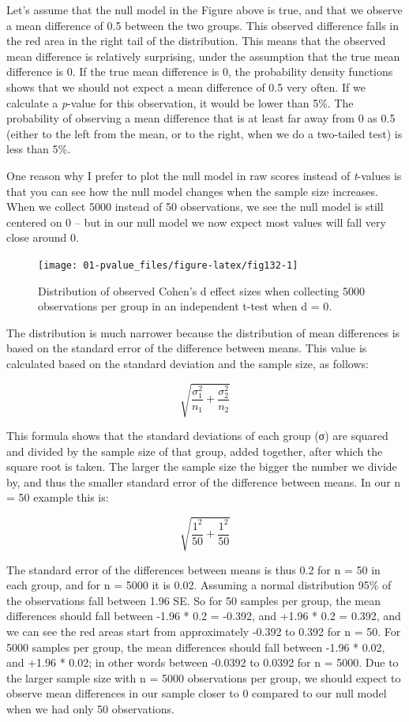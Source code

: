 \documentclass[
  oneside]{book}
\begin{document}
Let's assume that the null model in the Figure above is true, and that we observe a mean difference of 0.5 between the two groups. This observed difference falls in the red area in the right tail of the distribution. This means that the observed mean difference is relatively surprising, under the assumption that the true mean difference is 0. If the true mean difference is 0, the probability density functions shows that we should not expect a mean difference of 0.5 very often. If we calculate a \emph{p}-value for this observation, it would be lower than 5\%. The probability of observing a mean difference that is at least far away from 0 as 0.5 (either to the left from the mean, or to the right, when we do a two-tailed test) is less than 5\%.

One reason why I prefer to plot the null model in raw scores instead of \emph{t}-values is that you can see how the null model changes when the sample size increases. When we collect 5000 instead of 50 observations, we see the null model is still centered on 0 -- but in our null model we now expect most values will fall very close around 0.

\begin{figure}

{\centering \texttt{[image: 01-pvalue\_files/figure-latex/fig132-1]} 

}

\caption{Distribution of observed Cohen's d effect sizes when collecting 5000 observations per group in an independent t-test when d = 0.}\label{fig:fig132}
\end{figure}

The distribution is much narrower because the distribution of mean differences is based on the standard error of the difference between means. This value is calculated based on the standard deviation and the sample size, as follows:

\[\sqrt{\frac{\sigma_{1}^{2}}{n_{1}}+\frac{\sigma_{2}^{2}}{n_{2}}}\]

This formula shows that the standard deviations of each group (σ) are squared and divided by the sample size of that group, added together, after which the square root is taken. The larger the sample size the bigger the number we divide by, and thus the smaller standard error of the difference between means. In our n = 50 example this is:

\[\sqrt{\frac{1^{2}}{50}+\frac{1^{2}}{50}}\]

The standard error of the differences between means is thus 0.2 for n = 50 in each group, and for n = 5000 it is 0.02. Assuming a normal distribution 95\% of the observations fall between 1.96 SE. So for 50 samples per group, the mean differences should fall between -1.96 * 0.2 = -0.392, and +1.96 * 0.2 = 0.392, and we can see the red areas start from approximately -0.392 to 0.392 for n = 50. For 5000 samples per group, the mean differences should fall between -1.96 * 0.02, and +1.96 * 0.02; in other words between -0.0392 to 0.0392 for n = 5000. Due to the larger sample size with n = 5000 observations per group, we should expect to observe mean differences in our sample closer to 0 compared to our null model when we had only 50 observations.
\end{document}
